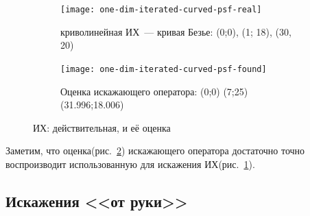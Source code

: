 \begin{figure}[h!]
	\centering
	\begin{subfigure}[t]{0.475\textwidth}
		\centering
		\texttt{[image: one-dim-iterated-curved-psf-real]}
		\caption{криволинейная ИХ~--- кривая Безье: (0;0), (1; 18), (30, 20)}
		\label{fig:oneDimIterPsfTrue}
	\end{subfigure}
	\hfill
	\begin{subfigure}[t]{0.475\textwidth}
		\centering
		\texttt{[image: one-dim-iterated-curved-psf-found]}
		\caption{Оценка искажающего оператора: (0;0) (7;25) (31.996;18.006)}
		\label{fig:oneDimIterPsfFound}
	\end{subfigure}
	\caption{ИХ: действительная, и её оценка}
	\label{fig:oneDimIterPsf}
\end{figure}
Заметим, что оценка(рис.~\ref{fig:oneDimIterPsfFound}) искажающего оператора достаточно точно воспроизводит использованную для искажения ИХ(рис.~\ref{fig:oneDimIterPsfTrue}).

\subsection{Искажения <<от руки>>}


